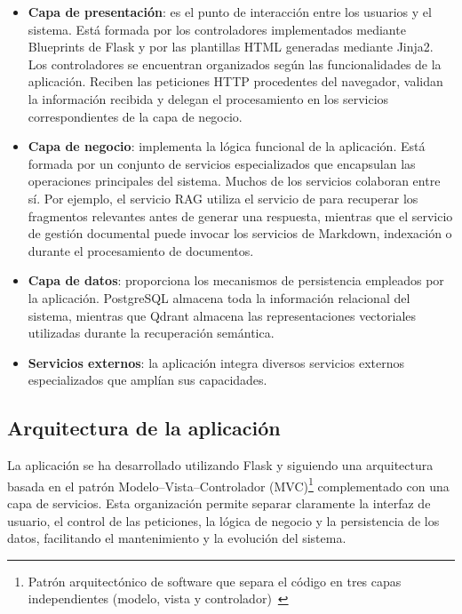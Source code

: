 
\begin{itemize}
	\item \textbf{Capa de presentación}: es el punto de interacción entre los usuarios y el sistema. Está formada por los controladores implementados mediante Blueprints de Flask y por las plantillas HTML generadas mediante Jinja2. Los controladores se encuentran organizados según las funcionalidades de la aplicación. Reciben las peticiones HTTP procedentes del navegador, validan la información recibida y delegan el procesamiento en los servicios correspondientes de la capa de negocio.
	\item \textbf{Capa de negocio}: implementa la lógica funcional de la aplicación. Está formada por un conjunto de servicios especializados que encapsulan las operaciones principales del sistema. Muchos de los servicios colaboran entre sí. Por ejemplo, el servicio RAG utiliza el servicio de  para recuperar los fragmentos relevantes antes de generar una respuesta, mientras que el servicio de gestión documental puede invocar los servicios de Markdown, indexación o  durante el procesamiento de documentos.
	\item \textbf{Capa de datos}: proporciona los mecanismos de persistencia empleados por la aplicación. PostgreSQL almacena toda la información relacional del sistema, mientras que Qdrant almacena las representaciones vectoriales utilizadas durante la recuperación semántica.
	\item \textbf{Servicios externos}: la aplicación integra diversos servicios externos especializados que amplían sus capacidades.
\end{itemize}


\subsection{Arquitectura de la aplicación }
\label{dis:MVC}
La aplicación  se ha desarrollado utilizando Flask y siguiendo una arquitectura basada en el patrón Modelo--Vista--Controlador (MVC)\footnote{Patrón arquitectónico de software que separa el código en tres capas independientes (modelo, vista y controlador)~\cite{diseño:MVC}} complementado con una capa de servicios. Esta organización permite separar claramente la interfaz de usuario, el control de las peticiones, la lógica de negocio y la persistencia de los datos, facilitando el mantenimiento y la evolución del sistema.

